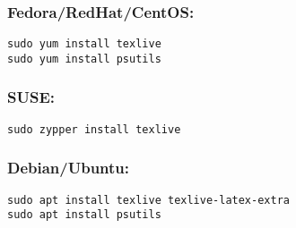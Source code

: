 \subsubsection*{Fedora/RedHat/CentOS:}
\begin{verbatim} 
sudo yum install texlive 
sudo yum install psutils 
\end{verbatim}


\subsubsection*{SUSE:}
\begin{verbatim}
sudo zypper install texlive
\end{verbatim}


\subsubsection*{Debian/Ubuntu:}
\begin{verbatim} 
sudo apt install texlive texlive-latex-extra 
sudo apt install psutils
\end{verbatim}
